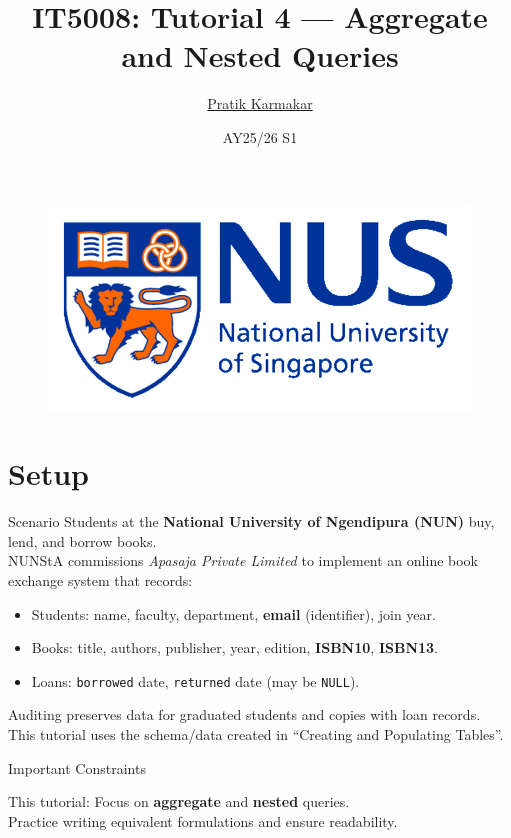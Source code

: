 \documentclass{beamer}
\author{\href{https://pratik2358.github.io/}{Pratik Karmakar}}
\title{IT5008: Tutorial 4 — Aggregate and Nested Queries}
\institute{
  School of Computing,\\
  National University of Singapore
}
\date{AY25/26 S1}
\begin{document}
\begin{frame}
  \titlepage
  \begin{figure}[htpb]
    \begin{center}
      \includegraphics[keepaspectratio, scale=0.18]{nus-logo.png}
    \end{center}
  \end{figure}
\end{frame}

\section{Setup}
\begin{frame}{Scenario}
\small
Students at the \textbf{National University of Ngendipura (NUN)} buy, lend, and borrow books.\\
NUNStA commissions \emph{Apasaja Private Limited} to implement an online book exchange system that records:
\begin{itemize}\itemsep3pt
  \item Students: name, faculty, department, \textbf{email} (identifier), join year.
  \item Books: title, authors, publisher, year, edition, \textbf{ISBN10}, \textbf{ISBN13}.
  \item Loans: \texttt{borrowed} date, \texttt{returned} date (may be \texttt{NULL}).
\end{itemize}
Auditing preserves data for graduated students and copies with loan records. \\
This tutorial uses the schema/data created in “Creating and Populating Tables”.
\end{frame}

\begin{frame}{Important Constraints}
\Large
\begin{block}{This tutorial:}
Focus on \textbf{aggregate} and \textbf{nested} queries.\\
Practice writing equivalent formulations and ensure readability.
\end{block}
\end{frame}
\end{document}
